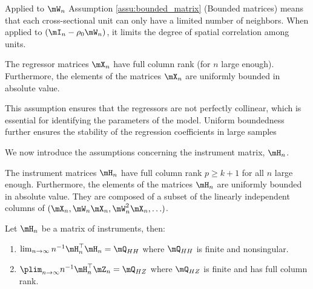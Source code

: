 \begin{remark}
Applied to $\mW_n$ Assumption \ref{assu:bounded_matrix} (Bounded matrices) means that each cross-sectional unit can only have a limited number of neighbors. When applied to $\left(\mI_n - \rho _0\mW_n\right)$, it limits the degree of spatial correlation among units. 
\end{remark}

\begin{assumption}\label{assu:regressors}
The regressor matrices $\mX_n$ have full column rank (for $n$ large enough). Furthermore, the elements of the matrices $\mX_n$ are uniformly bounded in absolute value.
\end{assumption}

This assumption ensures that the regressors are not perfectly collinear, which is essential for identifying the parameters of the model. Uniform boundedness further ensures the stability of the regression coefficients in large samples

We now introduce the assumptions concerning the instrument matrix, $\mH_n$.

\begin{assumption}\label{assu:iv_instr}
The instrument matrices $\mH_n$ have full column rank $p \geq k + 1$ for all $n$ large enough. Furthermore, the elements of the matrices $\mH_n$ are uniformly bounded in absolute value. They are composed of a subset of the linearly independent columns of $(\mX_n, \mW_n\mX_n, \mW^2_n\mX_n, \ldots)$.
\end{assumption}


\begin{assumption}\label{assu:iv_instr_lim}
Let $\mH_n$ be a matrix of instruments, then:
\begin{enumerate}
  \item $\lim_{n\to \infty} n^{-1}\mH_n^\top\mH_n = \mQ_{HH}$ where $\mQ_{HH}$ is finite and nonsingular. 
  \item $\plim_{n\to \infty} n^{-1}\mH_n^\top\mZ_n = \mQ_{HZ}$ where $\mQ_{HZ}$ is finite and has full column rank.
\end{enumerate}
\end{assumption}

